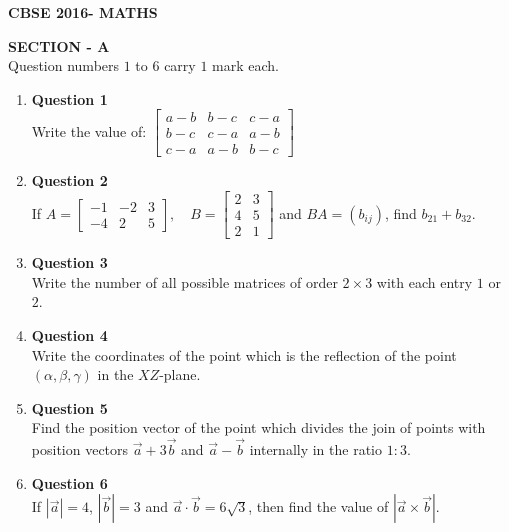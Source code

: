 \documentclass[12pt]{article}
\begin{document}
\pagestyle{fancy}
\fancyhf{}

\begin{center}
\Large\textbf{CBSE 2016- MATHS}
\end{center}
\begin{center}
    \Large \textbf{SECTION - A} \\
    \normalsize
    Question numbers $1$ to $6$ carry $1$ mark each.
\end{center}

\vspace{1em}
\begin{enumerate}

\item \textbf{Question 1}\\
Write the value of:  
$
\begin{bmatrix}
a - b & b - c & c - a \\
b - c & c - a & a - b \\
c - a & a - b & b - c
\end{bmatrix}
$

\item \textbf{Question 2}\\
If  
$
A = \begin{bmatrix} -1 & -2 & 3 \\ -4 & 2 & 5 \end{bmatrix}, 
\quad B = \begin{bmatrix} 2 & 3 \\ 4 & 5 \\ 2 & 1 \end{bmatrix}
$
and $BA = (b_{ij})$, find $b_{21} + b_{32}$.

\item \textbf{Question 3}\\
Write the number of all possible matrices of order $2 \times 3$ with each entry $1$ or $2$.

\item \textbf{Question 4}\\
Write the coordinates of the point which is the reflection of the point $(\alpha, \beta, \gamma)$ in the $XZ$-plane.

\item \textbf{Question 5} \\
Find the position vector of the point which divides the join of points with position vectors $\vec{a} + 3\vec{b}$ and $\vec{a} - \vec{b}$ internally in the ratio $1 : 3$.

\item \textbf{Question 6} \\
If $|\vec{a}| = 4$, $|\vec{b}| = 3$ and $\vec{a} \cdot \vec{b} = 6\sqrt{3}$, then find the value of $|\vec{a} \times \vec{b}|$.

\end{enumerate}
\end{document}
